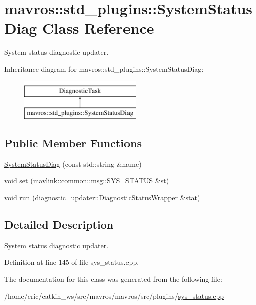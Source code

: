 \hypertarget{classmavros_1_1std__plugins_1_1SystemStatusDiag}{}\section{mavros\+::std\+\_\+plugins\+::System\+Status\+Diag Class Reference}
\label{classmavros_1_1std__plugins_1_1SystemStatusDiag}


System status diagnostic updater.  


Inheritance diagram for mavros\+::std\+\_\+plugins\+::System\+Status\+Diag\+:\begin{figure}[H]
\begin{center}
\leavevmode
\includegraphics[height=2.000000cm]{classmavros_1_1std__plugins_1_1SystemStatusDiag}
\end{center}
\end{figure}
\subsection*{Public Member Functions}
\begin{DoxyCompactItemize}
\item 
\mbox{\hyperlink{group__plugin_ga8a20cabc2080762291d761bb2cbcdc67}{System\+Status\+Diag}} (const std\+::string \&name)
\item 
void \mbox{\hyperlink{group__plugin_gaaa81bef57bcfc548116f3c98d9fdd168}{set}} (mavlink\+::common\+::msg\+::\+S\+Y\+S\+\_\+\+S\+T\+A\+T\+US \&st)
\item 
void \mbox{\hyperlink{group__plugin_ga41ef975786e414cd2a33deb33de19847}{run}} (diagnostic\+\_\+updater\+::\+Diagnostic\+Status\+Wrapper \&stat)
\end{DoxyCompactItemize}


\subsection{Detailed Description}
System status diagnostic updater. 

Definition at line 145 of file sys\+\_\+status.\+cpp.



The documentation for this class was generated from the following file\+:\begin{DoxyCompactItemize}
\item 
/home/eric/catkin\+\_\+ws/src/mavros/mavros/src/plugins/\mbox{\hyperlink{sys__status_8cpp}{sys\+\_\+status.\+cpp}}\end{DoxyCompactItemize}
